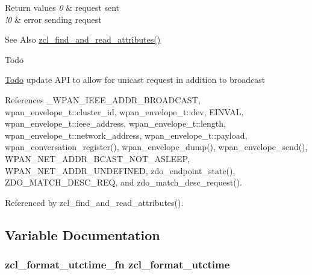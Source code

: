 \begin{DoxyRetVals}{Return values}
{\em 0} & request sent \\
\hline
{\em !0} & error sending request\\
\hline
\end{DoxyRetVals}
\begin{DoxySeeAlso}{See Also}
\hyperlink{group__zcl__client_gae673efbd325cea1f3befacda58332191}{zcl\-\_\-find\-\_\-and\-\_\-read\-\_\-attributes()}
\end{DoxySeeAlso}
\begin{DoxyRefDesc}{Todo}
\item[\hyperlink{todo__todo000016}{Todo}]update A\-P\-I to allow for unicast request in addition to broadcast \end{DoxyRefDesc}


References \-\_\-\-W\-P\-A\-N\-\_\-\-I\-E\-E\-E\-\_\-\-A\-D\-D\-R\-\_\-\-B\-R\-O\-A\-D\-C\-A\-S\-T, wpan\-\_\-envelope\-\_\-t\-::cluster\-\_\-id, wpan\-\_\-envelope\-\_\-t\-::dev, E\-I\-N\-V\-A\-L, wpan\-\_\-envelope\-\_\-t\-::ieee\-\_\-address, wpan\-\_\-envelope\-\_\-t\-::length, wpan\-\_\-envelope\-\_\-t\-::network\-\_\-address, wpan\-\_\-envelope\-\_\-t\-::payload, wpan\-\_\-conversation\-\_\-register(), wpan\-\_\-envelope\-\_\-dump(), wpan\-\_\-envelope\-\_\-send(), W\-P\-A\-N\-\_\-\-N\-E\-T\-\_\-\-A\-D\-D\-R\-\_\-\-B\-C\-A\-S\-T\-\_\-\-N\-O\-T\-\_\-\-A\-S\-L\-E\-E\-P, W\-P\-A\-N\-\_\-\-N\-E\-T\-\_\-\-A\-D\-D\-R\-\_\-\-U\-N\-D\-E\-F\-I\-N\-E\-D, zdo\-\_\-endpoint\-\_\-state(), Z\-D\-O\-\_\-\-M\-A\-T\-C\-H\-\_\-\-D\-E\-S\-C\-\_\-\-R\-E\-Q, and zdo\-\_\-match\-\_\-desc\-\_\-request().



Referenced by zcl\-\_\-find\-\_\-and\-\_\-read\-\_\-attributes().



\subsection{Variable Documentation}
\hypertarget{group__zcl__client_gaece15f78359a3bae016be1d24e7d9ad9}{
\subsubsection[{zcl\-\_\-format\-\_\-utctime}]{\setlength{\rightskip}{0pt plus 5cm}zcl\-\_\-format\-\_\-utctime\-\_\-fn zcl\-\_\-format\-\_\-utctime}}\label{group__zcl__client_gaece15f78359a3bae016be1d24e7d9ad9}



